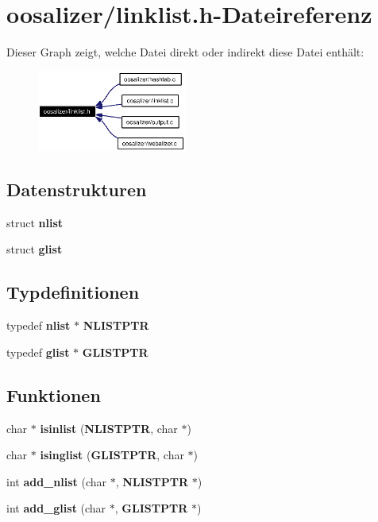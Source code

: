 \section{oosalizer/linklist.h-Dateireferenz}
\label{linklist_8h}


Dieser Graph zeigt, welche Datei direkt oder indirekt diese Datei enth\"{a}lt:\begin{figure}[H]
\begin{center}
\leavevmode
\includegraphics[width=139pt]{linklist_8h__dep__incl}
\end{center}
\end{figure}
\subsection*{Datenstrukturen}
\begin{CompactItemize}
\item 
struct {\bf nlist}
\item 
struct {\bf glist}
\end{CompactItemize}
\subsection*{Typdefinitionen}
\begin{CompactItemize}
\item 
typedef {\bf nlist} $\ast$ {\bf NLISTPTR}
\item 
typedef {\bf glist} $\ast$ {\bf GLISTPTR}
\end{CompactItemize}
\subsection*{Funktionen}
\begin{CompactItemize}
\item 
char $\ast$ {\bf isinlist} ({\bf NLISTPTR}, char $\ast$)
\item 
char $\ast$ {\bf isinglist} ({\bf GLISTPTR}, char $\ast$)
\item 
int {\bf add\_\-nlist} (char $\ast$, {\bf NLISTPTR} $\ast$)
\item 
int {\bf add\_\-glist} (char $\ast$, {\bf GLISTPTR} $\ast$)
\end{CompactItemize}
